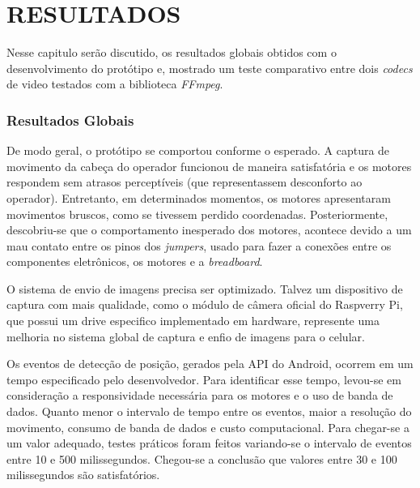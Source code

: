 
\chapter{RESULTADOS}
\label{chap:resultados}

Nesse capitulo serão discutido, os resultados globais obtidos com o desenvolvimento do protótipo e, mostrado um teste comparativo entre dois \textit{codecs} de video testados com a biblioteca \textit{FFmpeg}.\par

\subsection{Resultados Globais}
\label{subsec:resglobais}

De modo geral, o protótipo se comportou conforme o esperado. A captura de movimento da cabeça do operador funcionou de maneira satisfatória e os motores respondem sem atrasos perceptíveis (que representassem desconforto ao operador). Entretanto, em determinados momentos, os motores apresentaram movimentos bruscos, como se tivessem perdido coordenadas. Posteriormente, descobriu-se que o comportamento inesperado dos motores, acontece devido a um mau contato entre os pinos dos \textit{jumpers}, usado para fazer a conexões entre os componentes eletrônicos, os motores e a \textit{breadboard}. \par

O sistema de envio de imagens precisa ser optimizado. Talvez um dispositivo de captura com mais qualidade, como o módulo de câmera oficial do Raspverry Pi, que possui um drive especifico implementado em hardware, represente uma melhoria no sistema global de captura e enfio de imagens para o celular.\par

Os eventos de detecção de posição, gerados pela API do Android, ocorrem em um tempo especificado pelo desenvolvedor. Para identificar esse tempo, levou-se em consideração a responsividade necessária para os motores e o uso de banda de dados. Quanto menor o intervalo de tempo entre os eventos, maior a resolução do movimento,  consumo de banda de dados e custo computacional. Para chegar-se a um valor adequado, testes práticos foram feitos variando-se o intervalo de eventos entre 10 e 500 milissegundos. Chegou-se a conclusão que valores entre 30 e 100 milissegundos são satisfatórios.\par

